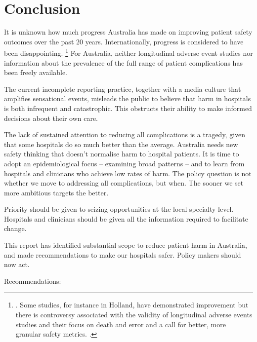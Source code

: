 \documentclass[FrontPage]{grattan}
\begin{document}
\chapter{Conclusion}\label{chap:conclusion}

It is unknown how much progress Australia has made on improving patient safety outcomes over the past 20 years.
Internationally, progress is considered to have been disappointing.%
	\footnote{\textcite{Vincent-2016-Safer-Healthcare}. Some studies, for instance in Holland, have demonstrated improvement but there is controversy associated with the validity of longitudinal adverse events studies and their focus on death and error and a call for better, more granular safety metrics. \textcites{Shojania541-Temporal-trends-in-patient-safety-Netherlands}{baines2015effective}{Shojania_2016}.}
For Australia, neither longitudinal adverse event studies nor information about the prevalence of the full range of patient complications has been freely available.

The current incomplete reporting practice, together with a media culture that amplifies sensational events, misleads the public to believe that harm in hospitals is both infrequent and catastrophic.
This obstructs their ability to make informed decisions about their own care.

The lack of sustained attention to reducing all complications is a tragedy, given that some hospitals do so much better than the average.
Australia needs new safety thinking that doesn't normalise harm to hospital patients.
It is time to adopt an epidemiological focus -- examining broad patterns -- and to learn from hospitals and clinicians who achieve low rates of harm.
The policy question is not whether we move to addressing all complications, but when.
The sooner we set more ambitious targets the better.

Priority should be given to seizing opportunities at the local specialty level.
Hospitals and clinicians should be given all the information required to facilitate change.

This report has identified substantial scope to reduce patient harm in Australia, and made recommendations to make our hospitals safer.
Policy makers should now act.

Recommendations:
\end{document}
